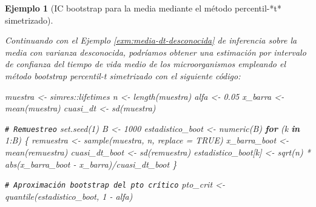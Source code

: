 \documentclass[
  10pt,
]{book}
\newenvironment{Shaded}{\begin{snugshade}}{\end{snugshade}}
\newcommand{\AttributeTok}[1]{\textcolor[rgb]{0.77,0.63,0.00}{#1}}
\newcommand{\CommentTok}[1]{\textcolor[rgb]{0.56,0.35,0.01}{\textit{#1}}}
\newcommand{\ConstantTok}[1]{\textcolor[rgb]{0.00,0.00,0.00}{#1}}
\newcommand{\ControlFlowTok}[1]{\textcolor[rgb]{0.13,0.29,0.53}{\textbf{#1}}}
\newcommand{\DecValTok}[1]{\textcolor[rgb]{0.00,0.00,0.81}{#1}}
\newcommand{\FloatTok}[1]{\textcolor[rgb]{0.00,0.00,0.81}{#1}}
\newcommand{\FunctionTok}[1]{\textcolor[rgb]{0.00,0.00,0.00}{#1}}
\newcommand{\NormalTok}[1]{#1}
\newcommand{\OtherTok}[1]{\textcolor[rgb]{0.56,0.35,0.01}{#1}}
\newcommand{\SpecialCharTok}[1]{\textcolor[rgb]{0.00,0.00,0.00}{#1}}
\theoremstyle{break}
\newtheorem{example}{Ejemplo}[chapter]
\theoremstyle{nonumberplain}
\renewcommand{\CommentTok}[1]{\textcolor[rgb]{0.41,0.41,0.41}{\texttt{#1}}}
\begin{document}
\begin{example}[IC bootstrap para la media mediante el método percentil-*t* simetrizado]
\protect\hypertarget{exm:media-ic-stu-sim}{}\label{exm:media-ic-stu-sim}

Continuando con el Ejemplo \ref{exm:media-dt-desconocida} de inferencia sobre la media con varianza desconocida, podríamos obtener una estimación por intervalo de confianza del tiempo de vida medio de los microorganismos empleando el método bootstrap percentil-\emph{t} simetrizado con el siguiente código:

\begin{Shaded}
\begin{Highlighting}[]
\NormalTok{muestra }\OtherTok{\textless{}{-}}\NormalTok{ simres}\SpecialCharTok{::}\NormalTok{lifetimes}
\NormalTok{n }\OtherTok{\textless{}{-}} \FunctionTok{length}\NormalTok{(muestra)}
\NormalTok{alfa }\OtherTok{\textless{}{-}} \FloatTok{0.05}
\NormalTok{x\_barra }\OtherTok{\textless{}{-}} \FunctionTok{mean}\NormalTok{(muestra)}
\NormalTok{cuasi\_dt }\OtherTok{\textless{}{-}} \FunctionTok{sd}\NormalTok{(muestra)}

\CommentTok{\# Remuestreo}
\FunctionTok{set.seed}\NormalTok{(}\DecValTok{1}\NormalTok{)}
\NormalTok{B }\OtherTok{\textless{}{-}} \DecValTok{1000}
\NormalTok{estadistico\_boot }\OtherTok{\textless{}{-}} \FunctionTok{numeric}\NormalTok{(B)}
\ControlFlowTok{for}\NormalTok{ (k }\ControlFlowTok{in} \DecValTok{1}\SpecialCharTok{:}\NormalTok{B) \{}
\NormalTok{  remuestra }\OtherTok{\textless{}{-}} \FunctionTok{sample}\NormalTok{(muestra, n, }\AttributeTok{replace =} \ConstantTok{TRUE}\NormalTok{)}
\NormalTok{  x\_barra\_boot }\OtherTok{\textless{}{-}} \FunctionTok{mean}\NormalTok{(remuestra)}
\NormalTok{  cuasi\_dt\_boot }\OtherTok{\textless{}{-}} \FunctionTok{sd}\NormalTok{(remuestra)}
\NormalTok{  estadistico\_boot[k] }\OtherTok{\textless{}{-}} \FunctionTok{sqrt}\NormalTok{(n) }\SpecialCharTok{*} \FunctionTok{abs}\NormalTok{(x\_barra\_boot }\SpecialCharTok{{-}}\NormalTok{ x\_barra)}\SpecialCharTok{/}\NormalTok{cuasi\_dt\_boot}
\NormalTok{\}}

\CommentTok{\# Aproximación bootstrap del pto crítico}
\NormalTok{pto\_crit }\OtherTok{\textless{}{-}} \FunctionTok{quantile}\NormalTok{(estadistico\_boot, }\DecValTok{1} \SpecialCharTok{{-}}\NormalTok{ alfa)}


\end{Highlighting}
\end{Shaded}
\end{example}
\end{document}
